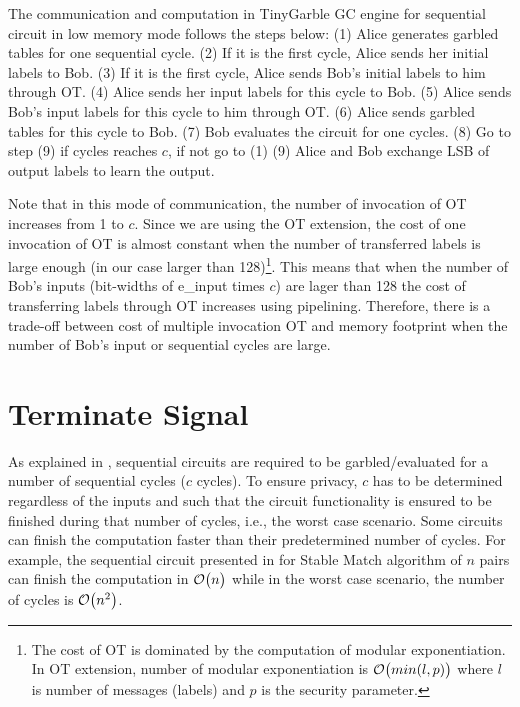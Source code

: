 The communication and computation in TinyGarble GC engine for sequential circuit in low memory mode follows the steps below:
(1) Alice generates garbled tables for one sequential cycle.
(2) If it is the first cycle, Alice sends her initial labels to Bob.
(3) If it is the first cycle, Alice sends Bob's initial labels to him through OT.
(4) Alice sends her input labels for this cycle to Bob.
(5) Alice sends Bob's input labels for this cycle to him through OT.
(6) Alice sends garbled tables for this cycle to Bob.
(7) Bob evaluates the circuit for one cycles.
(8) Go to step (9) if cycles reaches $c$, if not go to (1) 
(9) Alice and Bob exchange LSB of output labels to learn the output.

Note that in this mode of communication, the number of invocation of OT increases from 1 to $c$.
Since we are using the OT extension, the cost of one invocation of OT is almost constant when the number of transferred labels is large enough (in our case larger than 128)\footnote{The cost of OT is dominated by the computation of modular exponentiation. In OT extension, number of modular exponentiation is $\mathcal{O}\bigl(min(l, p)\bigr)$ where $l$ is number of messages (labels) and $p$ is the security parameter.}.
This means that when the number of Bob's inputs (bit-widths of e\_input times $c$) are lager than 128 the cost of transferring labels through OT increases using pipelining.
Therefore, there is a trade-off between cost of multiple invocation OT and memory footprint when the number of Bob's input or sequential cycles are large.

\section{Terminate Signal}\label{sec:engine-term}
As explained in , sequential circuits are required to be garbled/evaluated for a number of sequential cycles ($c$ cycles).
To ensure privacy, $c$ has to be determined regardless of the inputs and such that the circuit functionality is ensured to be finished during that number of cycles, i.e., the worst case scenario.
Some circuits can finish the computation faster than their predetermined number of cycles.
For example, the sequential circuit presented in \cite{riazi2017toward} for Stable Match algorithm of $n$ pairs can finish the computation in $\mathcal{O}\bigl(n\bigr)$ while in the worst case scenario, the number of cycles is $\mathcal{O}\bigl(n^2\bigr)$.

